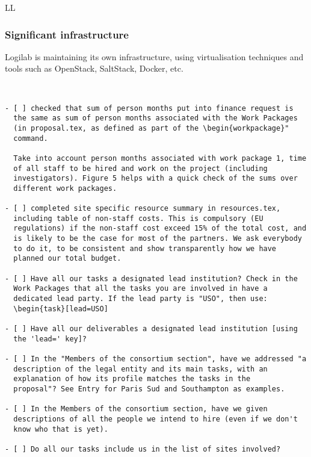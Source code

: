 \begin{sitedescription}{LL}
\subsubsection*{Significant infrastructure}

Logilab is maintaining its own infrastructure, using virtualisation techniques
and tools such as OpenStack, SaltStack, Docker, etc.

\end{sitedescription}



\begin{draft}
\\
\vspace{1cm}

\begin{verbatim}
- [ ] checked that sum of person months put into finance request is
  the same as sum of person months associated with the Work Packages
  (in proposal.tex, as defined as part of the \begin{workpackage}"
  command.

  Take into account person months associated with work package 1, time
  of all staff to be hired and work on the project (including
  investigators). Figure 5 helps with a quick check of the sums over
  different work packages.

- [ ] completed site specific resource summary in resources.tex,
  including table of non-staff costs. This is compulsory (EU
  regulations) if the non-staff cost exceed 15% of the total cost, and
  is likely to be the case for most of the partners. We ask everybody
  to do it, to be consistent and show transparently how we have
  planned our total budget.

- [ ] Have all our tasks a designated lead institution? Check in the
  Work Packages that all the tasks you are involved in have a
  dedicated lead party. If the lead party is "USO", then use:
  \begin{task}[lead=USO]

- [ ] Have all our deliverables a designated lead institution [using
  the 'lead=' key]?

- [ ] In the "Members of the consortium section", have we addressed "a
  description of the legal entity and its main tasks, with an
  explanation of how its profile matches the tasks in the
  proposal"? See Entry for Paris Sud and Southampton as examples.

- [ ] In the Members of the consortium section, have we given
  descriptions of all the people we intend to hire (even if we don't
  know who that is yet).
  
- [ ] Do all our tasks include us in the list of sites involved?
\end{verbatim}
\end{draft}




